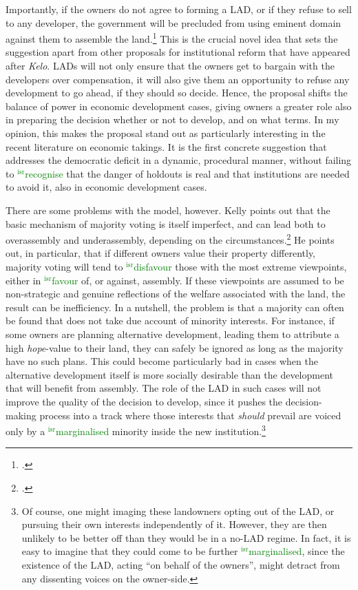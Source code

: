 \documentclass[12pt,a4paper]{book} %
\newcommand{\isr}[1]{\textcolor{green}{$^{\textrm{isr}}${#1}}}
\begin{document}
Importantly, if the owners do not agree to forming a LAD, or if they refuse to sell to any developer, the government will be precluded from using eminent domain against them to assemble the land.\footcite[1491]{heller08} This is the crucial novel idea that sets the suggestion apart from other proposals for institutional reform that have appeared after {\it Kelo}. LADs will not only ensure that the owners get to bargain with the developers over compensation, it will also give them an opportunity to refuse any development to go ahead, if they should so decide. Hence, the proposal shifts the balance of power in economic development cases, giving owners a greater role also in preparing the decision whether or not to develop, and on what terms. In my opinion, this makes the proposal stand out as particularly interesting in the recent literature on economic takings. It is the first concrete suggestion that addresses the democratic deficit in a dynamic, procedural manner, without failing to \isr{recognise} that the danger of holdouts is real and that institutions are needed to avoid it, also in economic development cases.

There are some problems with the model, however. Kelly points out that the basic mechanism of majority voting is itself imperfect, and can lead both to overassembly and underassembly, depending on the circumstances.\footcite{kelly09} He points out, in particular, that if different owners value their property differently, majority voting will tend to \isr{disfavour} those with the most extreme viewpoints, either in \isr{favour} of, or against, assembly. If these viewpoints are assumed to be non-strategic and genuine reflections of the welfare associated with the land, the result can be inefficiency. In a nutshell, the problem is that a majority can often be found that does not take due account of minority interests. For instance, if some owners are planning alternative development, leading them to attribute a high {\it hope}-value to their land, they can safely be ignored as long as the majority have no such plans. This could become particularly bad in cases when the alternative development itself is more socially desirable than the development that will benefit from assembly. The role of the LAD in such cases will not improve the quality of the decision to develop, since it pushes the decision-making process into a track where those interests that {\it should} prevail are voiced only by a \isr{marginalised} minority inside the new institution.\footnote{Of course, one might imaging these landowners opting out of the LAD, or pursuing their own interests independently of it. However, they are then unlikely to be better off than they would be in a no-LAD regime. In fact, it is easy to imagine that they could come to be further \isr{marginalised}, since the existence of the LAD, acting ``on behalf of the owners'', might detract from any dissenting voices on the owner-side.}
\end{document}
